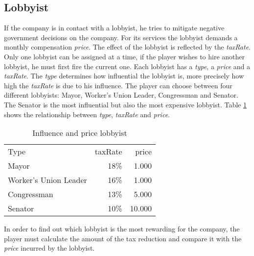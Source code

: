 \subsection{Lobbyist} \label{lobbyist_simulation}

If the company is in contact with a lobbyist, he tries to mitigate negative government decisions on the company. For its services the lobbyist demands a monthly compensation \textit{price}. The effect of the lobbyist is reflected by the \textit{taxRate}. \\

Only one lobbyist can be assigned at a time, if the player wishes to hire another lobbyist, he must first fire the current one. Each lobbyist has a \textit{type}, a \textit{price} and a \textit{taxRate}. The \textit{type} determines how influential the lobbyist is, more precisely how high the \textit{taxRate} is due to his influence. The player can choose between four different lobbyists: Mayor, Worker’s Union Leader, Congressman and Senator. The Senator is the most influential but also the most expensive lobbyist. Table \ref{influence_lobbyist} shows the relationship between \textit{type}, \textit{taxRate} and \textit{price}. \\

\begin{table}[ht]
\centering
\begin{tabular}{|l|r|r|}
\hline
Type                    & taxRate   & price \\
Mayor                   & 18\%      & 1.000     \\
Worker's Union Leader   & 16\%      & 1.000     \\
Congressman             & 13\%      & 5.000     \\
Senator                 & 10\%      & 10.000     \\
\hline
\end{tabular}
\caption{Influence and price lobbyist}
\label{influence_lobbyist}
\end{table}

In order to find out which lobbyist is the most rewarding for the company, the player must calculate the amount of the tax reduction and compare it with the \textit{price} incurred by the lobbyist.
 



 




